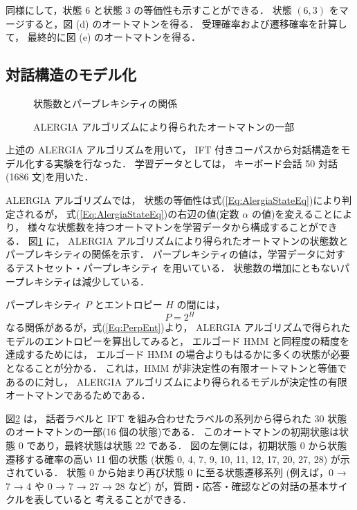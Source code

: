同様にして，状態 6 と状態 3 の等価性も示すことができる．
状態 $(6,3)$ をマージすると，図 (d) のオートマトンを得る．
受理確率および遷移確率を計算して，
最終的に図 (e) のオートマトンを得る．

\subsection{対話構造のモデル化}

\begin{figure}
\begin{center}
\end{center}
\caption{状態数とパープレキシティの関係}
\label{Fig:ALERGIA-STATE-ENTROPY}
\end{figure}

\begin{figure}
\begin{center}
\end{center}
\caption{ALERGIA アルゴリズムにより得られたオートマトンの一部}
\label{Fig:ALERGIA-IFT}
\end{figure}

上述の ALERGIA アルゴリズムを用いて，
IFT 付きコーパスから対話構造をモデル化する実験を行なった．
学習データとしては，
キーボード会話 50 対話(1686 文)を用いた．

ALERGIA アルゴリズムでは，
状態の等価性は式(\ref{Eq:AlergiaStateEq})により判定されるが，
式(\ref{Eq:AlergiaStateEq})の右辺の値(定数 $\alpha$ の値)を変えることにより，
様々な状態数を持つオートマトンを学習データから構成することができる．
図\ref{Fig:ALERGIA-STATE-ENTROPY} に，
ALERGIA アルゴリズムにより得られたオートマトンの状態数と
パープレキシティの関係を示す．
パープレキシティの値は，学習データに対するテストセット・パープレキシティ
を用いている．
状態数の増加にともないパープレキシティは減少している．

パープレキシティ $P$ とエントロピー $H$ の間には，
\begin{equation}
        P = 2^{H} \label{Eq:PerpEnt}
\end{equation}
なる関係があるが，式(\ref{Eq:PerpEnt})より，
ALERGIA アルゴリズムで得られたモデルのエントロピーを算出してみると，
エルゴード HMM と同程度の精度を達成するためには，
エルゴード HMM の場合よりもはるかに多くの状態が必要となることが分かる．
これは，HMM が非決定性の有限オートマトンと等価であるのに対し，
ALERGIA アルゴリズムにより得られるモデルが決定性の有限オートマトンであるためである．

図\ref{Fig:ALERGIA-IFT} は，
話者ラベルと IFT を組み合わせたラベルの系列から得られた
30 状態のオートマトンの一部(16 個の状態)である．
このオートマトンの初期状態は状態 0 であり，最終状態は状態 22 である．
図の左側には，初期状態 0 から状態遷移する確率の高い 11 個の状態
(状態 0, 4, 7, 9, 10, 11, 12, 17, 20, 27, 28)
が示されている．
状態 0 から始まり再び状態 0 に至る状態遷移系列
(例えば，0 → 7 → 4 や 0 → 7 → 27 → 28 など)
が，質問・応答・確認などの対話の基本サイクルを表していると
考えることができる．

